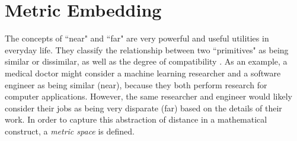 \section{Metric Embedding} \label{sec:MetricEmedding}

The concepts of ``near" and ``far" are very powerful and useful utilities in everyday life.  They classify the relationship between two ``primitives" as being similar or dissimilar, as well as the degree of compatibility \citep{Thorstensen2009ManifoldThesis}. As an example, a medical doctor might consider a machine learning researcher and a software engineer as being similar (near), because they both perform research for computer applications.  However, the same researcher and engineer would likely consider their jobs as being very disparate (far) based on the details of their work.  In order to capture this abstraction of distance in a mathematical construct, a \textit{metric space} is defined.


